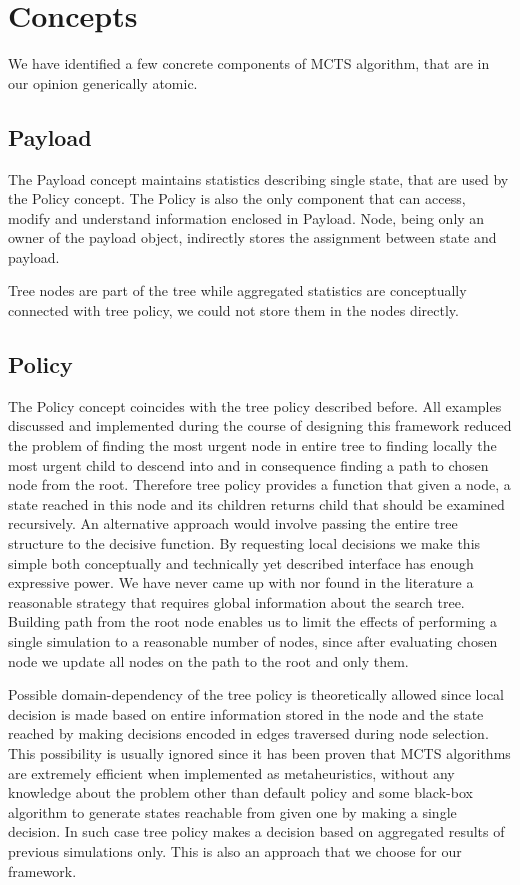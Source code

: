 \section{Concepts}
We have identified a few concrete components of MCTS algorithm, that are in our
opinion generically atomic.

\subsection{Payload}
The Payload concept maintains statistics describing single state, that are used
by the Policy concept. The Policy is also the only component that can access, modify
and understand information enclosed in Payload. Node, being only an owner of
the payload object, indirectly stores the assignment between state and payload.

Tree nodes are part of the tree while aggregated statistics are conceptually
connected with tree policy, we could not store them in the nodes directly.

\subsection{Policy}
The Policy concept coincides with the tree policy described before.
All examples discussed and implemented during the course of designing this
framework reduced the problem of finding the most urgent node in entire tree to
finding locally the most urgent child to descend into and in consequence
finding a path to chosen node from the root. Therefore tree policy provides a
function that given a node, a state reached in this node and its children
returns child that should be examined recursively. An alternative approach would
involve passing the entire tree structure to the decisive function. By requesting
local decisions we make this simple both conceptually and technically yet
described interface has enough expressive power. We have never came up with nor
found in the literature a reasonable strategy that requires global information
about the search tree.
Building path from the root node enables us to limit the effects of performing
a single simulation to a reasonable number of nodes, since after evaluating chosen
node we update all nodes on the path to the root and only them.

Possible domain-dependency of the tree policy is theoretically allowed since
local decision is made based on entire information stored in the node and the
state reached by making decisions encoded in edges traversed during node
selection.
This possibility is usually ignored since it has been proven that MCTS
algorithms are extremely efficient when implemented as metaheuristics, without
any knowledge about the problem other than default policy and some black-box
algorithm to generate states reachable from given one by making a single
decision. In such case tree policy makes a decision based on aggregated results
of previous simulations only.
This is also an approach that we choose for our framework.

